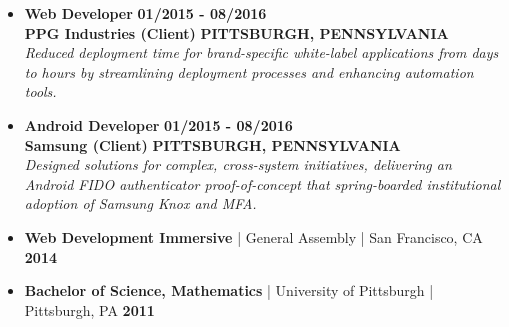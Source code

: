 \documentclass[10pt,letterpaper]{article}
\renewcommand{\section}[1]{%
  \par\vspace{8pt}%
  \noindent\colorbox{color1}{%
    \makebox[\dimexpr\textwidth-2\fboxsep\relax][c]{%
      \textcolor{white}{\ttfamily\bfseries\large\strut \MakeUppercase{#1}}%
    }%
  }%
  \par\vspace{4pt}%
}
\begin{document}
\begin{itemize}[label={}, leftmargin=0pt, itemsep=6pt, parsep=0pt]
\item{
\textbf{\ttfamily\normalsize Web Developer} \hfill \textbf{\ttfamily\normalsize\color{color1} 01/2015 - 08/2016}\\
\textbf{\ttfamily\small\color{color1} PPG Industries (Client)} \hfill \textbf{\ttfamily\small\color{color1} PITTSBURGH, PENNSYLVANIA}\vspace{2pt}\\
{\itshape\sffamily Reduced deployment time for brand-specific white-label applications from days to hours by streamlining deployment processes and enhancing automation tools.}
}

\item{
\textbf{\ttfamily\normalsize Android Developer} \hfill \textbf{\ttfamily\normalsize\color{color1} 01/2015 - 08/2016}\\
\textbf{\ttfamily\small\color{color1} Samsung (Client)} \hfill \textbf{\ttfamily\small\color{color1} PITTSBURGH, PENNSYLVANIA}\vspace{2pt}\\
{\itshape\sffamily Designed solutions for complex, cross-system initiatives, delivering an Android FIDO authenticator proof-of-concept that spring-boarded institutional adoption of Samsung Knox and MFA.}
}

\end{itemize}

\section{EDUCATION}
\vspace{1pt}
\begin{itemize}[label={}, leftmargin=0pt, itemsep=6pt]
\item{
\textbf{\ttfamily\large\color{color1} Web Development Immersive} {\sffamily | General Assembly | San Francisco, CA} \hfill \textbf{\ttfamily\large\color{color1} 2014}
}
\item{
\textbf{\ttfamily\large\color{color1} Bachelor of Science, Mathematics} {\sffamily | University of Pittsburgh | Pittsburgh, PA} \hfill \textbf{\ttfamily\large\color{color1} 2011}
}
\end{itemize}
\end{document}
